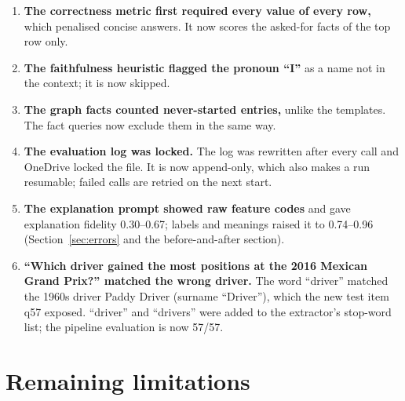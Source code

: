 \documentclass[10pt,a4paper]{article}
\begin{document}
\begin{enumerate}[label=(\alph*)]
\item \textbf{The correctness metric first required every value of every row,} which penalised concise answers. It now scores the asked-for facts of the top row only.
\item \textbf{The faithfulness heuristic flagged the pronoun ``I''} as a name not in the context; it is now skipped.
\item \textbf{The graph facts counted never-started entries,} unlike the templates. The fact queries now exclude them in the same way.
\item \textbf{The evaluation log was locked.} The log was rewritten after every call and OneDrive locked the file. It is now append-only, which also makes a run resumable; failed calls are retried on the next start.
\item \textbf{The explanation prompt showed raw feature codes} and gave explanation fidelity 0.30--0.67; labels and meanings raised it to 0.74--0.96 (Section~\ref{sec:errors} and the before-and-after section).
\item \textbf{``Which driver gained the most positions at the 2016 Mexican Grand Prix?'' matched the wrong driver.} The word ``driver'' matched the 1960s driver Paddy Driver (surname ``Driver''), which the new test item q57 exposed. ``driver'' and ``drivers'' were added to the extractor's stop-word list; the pipeline evaluation is now 57/57.
\end{enumerate}

\section{Remaining limitations}
\end{document}
